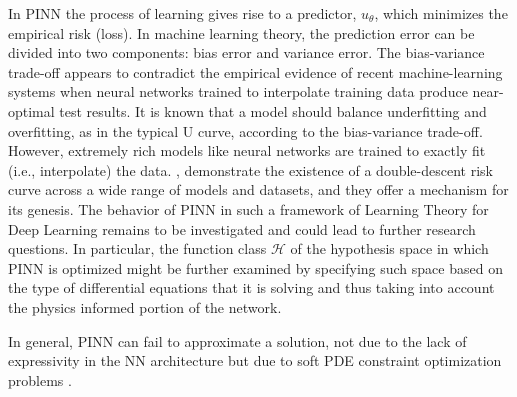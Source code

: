 \documentclass[pdflatex,sn-basic]{sn-jnl}%
\theoremstyle{thmstyleone}%
\theoremstyle{thmstyletwo}%
\theoremstyle{thmstylethree}%
\begin{document}
In PINN the process of learning gives rise to a predictor, $u_\theta$, which minimizes the empirical risk (loss).
In machine learning theory, the prediction error can be divided into two components: bias error and variance error.
%
The bias-variance trade-off appears to contradict the empirical evidence of recent machine-learning systems when neural networks trained to interpolate training data produce near-optimal test results.
It is known that a model should balance underfitting and overfitting, as in the typical U curve, according to the bias-variance trade-off.
However, extremely rich models like neural networks are trained to exactly fit (i.e., interpolate) the data.
\cite{Bel2019_ReconcilingModernMachine_HsuBHMM}, demonstrate the existence of a  double-descent risk curve across a wide range of models and datasets, and they offer a mechanism for its genesis. 
The behavior of PINN in such a framework of Learning Theory for Deep Learning remains to be investigated and could lead to further research questions. 
%
In particular, the function class $\mathcal{H}$ of the hypothesis space in which PINN is optimized might be further examined by specifying such space based on the type of differential equations that it is solving and thus taking into account the physics informed portion of the network. 




In general, PINN can fail to approximate a solution, not due to the lack of expressivity in the NN architecture but due to soft PDE constraint optimization problems \cite{Kri2021_CharacterizingPossibleFailure_GhoKGZ}.
\end{document}
